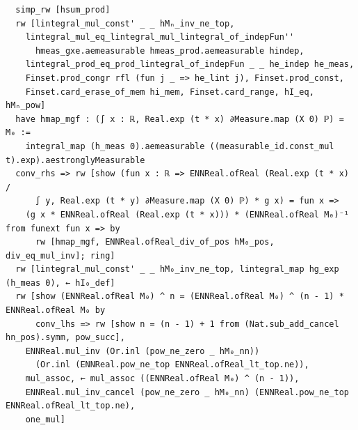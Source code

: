 \newpage
\begin{lstlisting}
  simp_rw [hsum_prod]
  rw [lintegral_mul_const' _ _ hMₙ_inv_ne_top,
    lintegral_mul_eq_lintegral_mul_lintegral_of_indepFun''
      hmeas_gxe.aemeasurable hmeas_prod.aemeasurable hindep,
    lintegral_prod_eq_prod_lintegral_of_indepFun _ _ he_indep he_meas,
    Finset.prod_congr rfl (fun j _ => he_lint j), Finset.prod_const,
    Finset.card_erase_of_mem hi_mem, Finset.card_range, hI_eq, hMₙ_pow]
  have hmap_mgf : (∫ x : ℝ, Real.exp (t * x) ∂Measure.map (X 0) ℙ) = M₀ :=
    integral_map (h_meas 0).aemeasurable ((measurable_id.const_mul t).exp).aestronglyMeasurable
  conv_rhs => rw [show (fun x : ℝ => ENNReal.ofReal (Real.exp (t * x) /
      ∫ y, Real.exp (t * y) ∂Measure.map (X 0) ℙ) * g x) = fun x =>
    (g x * ENNReal.ofReal (Real.exp (t * x))) * (ENNReal.ofReal M₀)⁻¹ from funext fun x => by
      rw [hmap_mgf, ENNReal.ofReal_div_of_pos hM₀_pos, div_eq_mul_inv]; ring]
  rw [lintegral_mul_const' _ _ hM₀_inv_ne_top, lintegral_map hg_exp (h_meas 0), ← hI₀_def]
  rw [show (ENNReal.ofReal M₀) ^ n = (ENNReal.ofReal M₀) ^ (n - 1) * ENNReal.ofReal M₀ by
      conv_lhs => rw [show n = (n - 1) + 1 from (Nat.sub_add_cancel hn_pos).symm, pow_succ],
    ENNReal.mul_inv (Or.inl (pow_ne_zero _ hM₀_nn))
      (Or.inl (ENNReal.pow_ne_top ENNReal.ofReal_lt_top.ne)),
    mul_assoc, ← mul_assoc ((ENNReal.ofReal M₀) ^ (n - 1)),
    ENNReal.mul_inv_cancel (pow_ne_zero _ hM₀_nn) (ENNReal.pow_ne_top ENNReal.ofReal_lt_top.ne),
    one_mul]
\end{lstlisting}
\newpage
